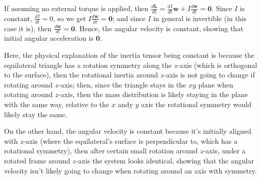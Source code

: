 \documentclass{article}
\newcommand{\bw}{\textbf{w}} %
\newcommand{\bzero}{\textbf{0}}
\begin{document}
If assuming no external torque is applied, then $\frac{d\textbf{L}}{dt}=\frac{dI}{dt}\bw + I\frac{d\bw}{dt}=\bzero$. Since $I$ is constant, $\frac{dI}{dt}=0$, so we get $I\frac{d\bw}{dt}=\bzero$; and since $I$ in general is invertible (in this case it is), then $\frac{d\bw}{dt}=\bzero$. Hence, the angular velocity is constant, showing that initial angular acceleration is $\bzero$.

Here, the physical explanation of the inertia tensor being constant is because the equilateral triangle has a rotation symmetry along the $z$-axis (which is orthogonal to the surface), then the rotational inertia around $z$-axis is not going to change if rotating around $z$-axis; then, since the triangle stays in the $xy$ plane when rotating around $z$-axis, then the mass distribution is likely staying in the plane with the same way, relative to the $x$ andy $y$ axis the rotational symmetry would likely stay the same. 

On the other hand, the angular velocity is constant because it's initially aligned with $z$-axis (where the equilateral's surface is perpendicular to, which has a rotational symmetry), then after certain small rotation around $z$-axis, under a rotated frame around $z$-axis the system looks identical, showing that the angular velocity isn't likely going to change when rotating around an axis with symmetry.
\end{document}
